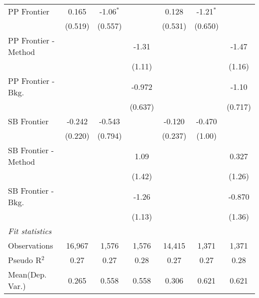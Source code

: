 \begin{tabular}{lcccccc}
   PP Frontier          & 0.165         & -1.06$^{*}$   &              & 0.128         & -1.21$^{*}$  &   \\   
                        & (0.519)       & (0.557)       &              & (0.531)       & (0.650)      &   \\   
   PP Frontier - Method &               &               & -1.31        &               &              & -1.47\\   
                        &               &               & (1.11)       &               &              & (1.16)\\   
   PP Frontier - Bkg.   &               &               & -0.972       &               &              & -1.10\\   
                        &               &               & (0.637)      &               &              & (0.717)\\   
   SB Frontier          & -0.242        & -0.543        &              & -0.120        & -0.470       &   \\   
                        & (0.220)       & (0.794)       &              & (0.237)       & (1.00)       &   \\   
   SB Frontier - Method &               &               & 1.09         &               &              & 0.327\\   
                        &               &               & (1.42)       &               &              & (1.26)\\   
   SB Frontier - Bkg.   &               &               & -1.26        &               &              & -0.870\\   
                        &               &               & (1.13)       &               &              & (1.36)\\   
   \midrule
   \emph{Fit statistics}\\
   Observations         & 16,967        & 1,576         & 1,576        & 14,415        & 1,371        & 1,371\\  
   Pseudo R$^2$         & 0.27          & 0.27          & 0.28         & 0.27          & 0.27         & 0.28\\  
Mean(Dep. Var.) & 0.265 & 0.558 & 0.558 & 0.306 & 0.621 & 0.621 \\
   

\end{tabular}
